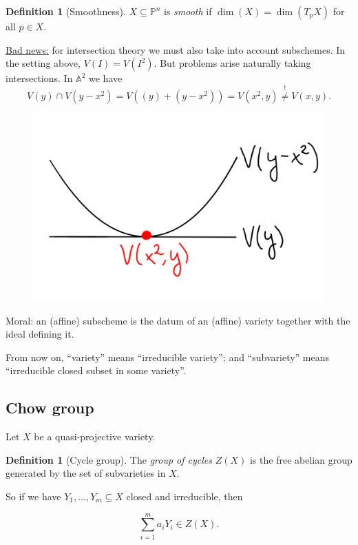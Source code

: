 \documentclass[12pt,a4paper]{amsart}
\theoremstyle{plain}
\theoremstyle{definition}
\newtheorem{defn}[thm]{Definition}
\theoremstyle{remark}
\begin{document}
\begin{defn}[Smoothness]
    $X\subseteq \mathbb{P}^{n}$ is \textit{smooth} if $\dim(X)=\dim(T_{p}X)$ for all $p\in X$.
\end{defn}

\underline{Bad news:} for intersection theory we must also take into account subschemes.
In the setting above, $V(I)=V(I^{2})$.
But problems arise naturally taking intersections.
In $\mathbb{A}^{2}$ we have
\[ V(y)\cap V(y-x^{2})=V((y)+(y-x^{2}))=V(x^{2},y)\overset{!}{\neq} V(x,y). \]
\begin{figure}[H]
    \centering
    \includegraphics[scale=.15]{pictures/tangent}
\end{figure}

Moral: an (affine) subscheme is the datum of an (affine) variety together with the ideal defining it.

From now on, ``variety'' means ``irreducible variety''; and ``subvariety'' means ``irreducible closed subset in some variety''.

\subsection{Chow group}

Let $X$ be a quasi-projective variety.

\begin{defn}[Cycle group]
    The \textit{group of cycles} $Z(X)$ is the free abelian group generated by the set of subvarieties in $X$.
\end{defn}

So if we have $Y_{1},\ldots,Y_{m}\subseteq X$ closed and irreducible, then

\[ \sum_{i=1}^{m}a_{i}Y_{i} \in Z(X). \]
\end{document}
